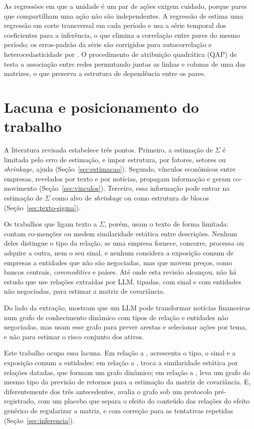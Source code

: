 As regressões em que a unidade é um par de ações exigem cuidado, porque pares que compartilham uma ação
não são independentes. A regressão de \citet{fama1973} estima uma regressão em corte transversal em cada
período e usa a série temporal dos coeficientes para a inferência, o que elimina a correlação entre pares
do mesmo período; os erros-padrão da série são corrigidos para autocorrelação e heterocedasticidade por
\citet{newey1987}. O procedimento de atribuição quadrática (QAP) de \citet{krackhardt1988} testa a
associação entre redes permutando juntas as linhas e colunas de uma das matrizes, o que preserva a
estrutura de dependência entre os pares.

\section{Lacuna e posicionamento do trabalho}
\label{sec:lacuna}

A literatura revisada estabelece três pontos. Primeiro, a estimação de $\Sigma$ é limitada pelo erro
de estimação, e impor estrutura, por fatores, setores ou \emph{shrinkage}, ajuda
(Seção~\ref{sec:estimacao}). Segundo, vínculos econômicos entre empresas, revelados por texto e por
notícias, propagam informação e geram co-movimento (Seção~\ref{sec:vinculos}). Terceiro, essa
informação pode entrar na estimação de $\Sigma$ como alvo de \emph{shrinkage} ou como estrutura de
blocos (Seção~\ref{sec:texto-sigma}).

Os trabalhos que ligam texto a $\Sigma$, porém, usam o texto de forma limitada: contam co-menções ou
medem similaridade estática entre descrições. Nenhum deles distingue o tipo da relação, se uma empresa
fornece, concorre, processa ou adquire a outra, nem o seu sinal, e nenhum considera a exposição comum
de empresas a entidades que não são negociadas, mas que movem preços, como bancos centrais,
\emph{commodities} e países. Até onde esta revisão alcançou, não há estudo que use relações extraídas
por LLM, tipadas, com sinal e com entidades não negociadas, para estimar a matriz de covariância.

Do lado da extração, \citet{li2024findkg} mostram que um LLM pode transformar notícias financeiras
num grafo de conhecimento dinâmico com tipos de relação e entidades não negociadas, mas usam esse grafo
para prever arestas e selecionar ações por tema, e não para estimar o risco conjunto dos ativos.

Este trabalho ocupa essa lacuna. Em relação a \citet{tang2019}, acrescenta o tipo, o sinal e a
exposição comum a entidades; em relação a \citet{becquin2023}, troca a similaridade estática por
relações datadas, que formam um grafo dinâmico; em relação a \citet{li2024findkg}, leva um grafo do
mesmo tipo da previsão de retornos para a estimação da matriz de covariância. E, diferentemente dos três antecedentes, avalia o
grafo sob um protocolo pré-registrado, com um placebo que separa o efeito do conteúdo das relações do
efeito genérico de regularizar a matriz, e com correção para as tentativas repetidas
(Seção~\ref{sec:inferencia}).

\clearpage
